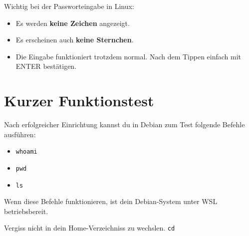 \documentclass[11pt, oneside, numbers=nönddot]{scrbook}
\begin{document}
Wichtig bei der Passworteingabe in Linux:
\begin{itemize}
\item Es werden \textbf{keine Zeichen} angezeigt.
\item Es erscheinen auch \textbf{keine Sternchen}.
\item Die Eingabe funktioniert trotzdem normal. Nach dem Tippen einfach mit ENTER bestätigen.
\end{itemize}

\section{Kurzer Funktionstest}
Nach erfolgreicher Einrichtung kannst du in Debian zum Test folgende Befehle ausführen:
\begin{itemize}
\item \texttt{whoami}
\item \texttt{pwd}
\item \texttt{ls}
\end{itemize}
Wenn diese Befehle funktionieren, ist dein Debian-System unter WSL betriebsbereit.

Vergiss nicht in dein Home-Verzeichniss zu wechslen. \texttt{cd ~}
\end{document}
